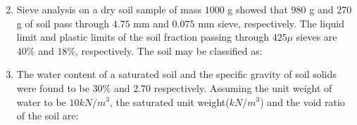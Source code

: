 \documentclass[journal]{IEEEtran}
\begin{document}
\begin{enumerate}[start=35]
\begin{center}
\end{center}
	\begin{enumerate}
	\begin{multicols}{4}
			\end{multicols}
	\end{enumerate}
\item Sieve analysis on a dry soil sample of mass $1000$ g showed that $980$ g and $270$ g of soil pass through $4.75$ mm and $0.075$ mm sieve, respectively. The liquid limit and plastic limits of the soil fraction passing through $425\mu$ sieves are $40\%$ and  $18\%$, respectively. The soil may be classified as:
	\begin{enumerate}
	\end{enumerate}
\item The water content of a saturated soil and the specific gravity of soil solids were found to be $30\%$ and $2.70$ respectively. Assuming the unit weight of water to be $10 kN/m^3$, the saturated unit weight($kN/m^3$) and the void ratio of the soil are: 
	\begin{enumerate}
		\begin{multicols}{4}
		\item $19.4, 0.81$
		\item $18.5, 0.30$

\end{multicols}
\end{enumerate}
\end{enumerate}
\end{document}
